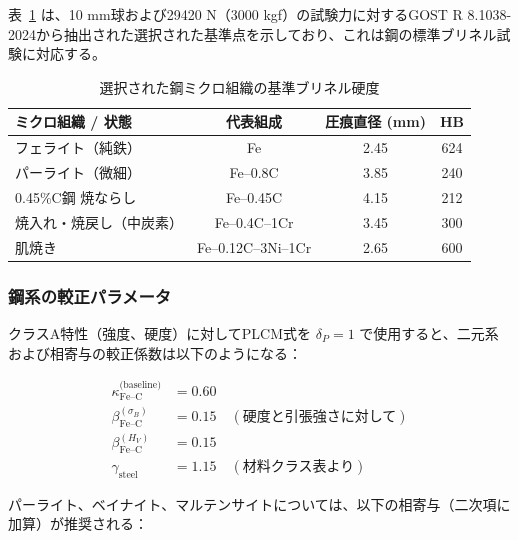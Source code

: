 \documentclass[12pt,a4paper]{article}
\begin{document}
	表~\ref{tab:steel_reference} は、10 mm球および29420 N（3000 kgf）の試験力に対するGOST R 8.1038-2024から抽出された選択された基準点を示しており、これは鋼の標準ブリネル試験に対応する。
	
	\begin{table}[htbp]
		\centering
		\caption{選択された鋼ミクロ組織の基準ブリネル硬度}
		\label{tab:steel_reference}
		\begin{tabular}{lccc}
			\toprule
			\textbf{ミクロ組織 / 状態} & \textbf{代表組成} & \textbf{圧痕直径 (mm)} & \textbf{HB} \\
			\midrule
			フェライト（純鉄） & Fe & 2.45 & 624 \\
			パーライト（微細） & Fe–0.8C & 3.85 & 240 \\
			0.45\%C鋼 焼ならし & Fe–0.45C & 4.15 & 212 \\
			焼入れ・焼戻し（中炭素） & Fe–0.4C–1Cr & 3.45 & 300 \\
			肌焼き & Fe–0.12C–3Ni–1Cr & 2.65 & 600 \\
			\bottomrule
		\end{tabular}
	\end{table}
	
	\subsubsection{鋼系の較正パラメータ}
	
	クラスA特性（強度、硬度）に対してPLCM式を \(\delta_P = 1\) で使用すると、二元系および相寄与の較正係数は以下のようになる：
	
	\begin{align*}
		\kappa_{\text{Fe–C}}^{\text{(baseline)}} &= 0.60 \\
		\beta_{\text{Fe–C}}^{(\sigma_B)} &= 0.15 \quad (\text{硬度と引張強さに対して}) \\
		\beta_{\text{Fe–C}}^{(H_V)} &= 0.15 \\
		\gamma_{\text{steel}} &= 1.15 \quad (\text{材料クラス表より})
	\end{align*}
	
	パーライト、ベイナイト、マルテンサイトについては、以下の相寄与（二次項に加算）が推奨される：
	
\end{document}
